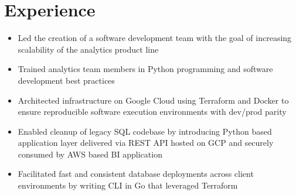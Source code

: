\documentclass[11pt,a4paper,sans]{moderncv}
\begin{document}
	\makecvtitle

	\section{Experience}
	\begin{itemize}
		\item Led the creation of a software development team with the goal of increasing scalability of the analytics product line
		\item Trained analytics team members in Python programming and software development best practices
		\item Architected infrastructure on Google Cloud using Terraform and Docker to ensure reproducible software execution environments with dev/prod parity
		\item Enabled cleanup of legacy SQL codebase by introducing Python based application layer delivered via REST API hosted on GCP and securely consumed by AWS based BI application
		\item Facilitated fast and consistent database deployments across client environments by writing CLI in Go that leveraged Terraform
	\end{itemize}
	\vspace{5mm}
\end{document}
